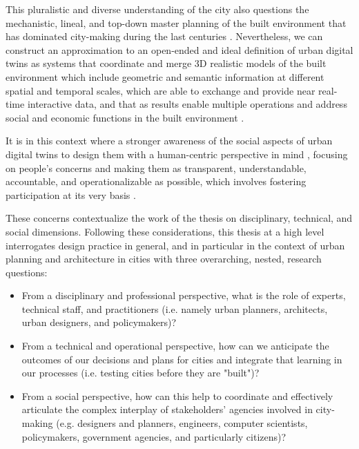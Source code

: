 This pluralistic and diverse understanding of the city also questions the mechanistic, lineal, and top-down master planning of the built environment that has dominated city-making during the last centuries \citep{Verebes2014}. Nevertheless, we can construct an approximation to an open-ended and ideal definition of urban digital twins as systems that coordinate and merge 3D realistic models of the built environment which include geometric and semantic information at different spatial and temporal scales, which are able to exchange and provide near real-time interactive data, and that as results enable multiple operations and address social and economic functions in the built environment \citep{Lei2023,Jeddoub2023}.

It is in this context where a stronger awareness of the social aspects of urban digital twins to design them with a human-centric perspective in mind \cite{Helbing2021}, focusing on people's concerns and making them as transparent, understandable, accountable, and operationalizable as possible, which involves fostering participation at its very basis \citep{White2021}. 

These concerns contextualize the work of the thesis on disciplinary, technical, and social dimensions.
Following these considerations, this thesis at a high level interrogates design practice in general, and in particular in the context of urban planning and architecture in cities with three overarching, nested, research questions:


\begin{itemize}
    \item From a disciplinary and professional perspective, what is the role of experts, technical staff, and practitioners (i.e. namely urban planners, architects, urban designers, and policymakers)?
    \item From a technical and operational perspective, how can we anticipate the outcomes of our decisions and plans for cities and integrate that learning in our processes (i.e. testing cities before they are "built")?
    \item From a social perspective, how can this help to coordinate and effectively articulate the complex interplay of stakeholders' agencies involved in city-making (e.g. designers and planners, engineers, computer scientists, policymakers, government agencies, and particularly citizens)? %
\end{itemize}

